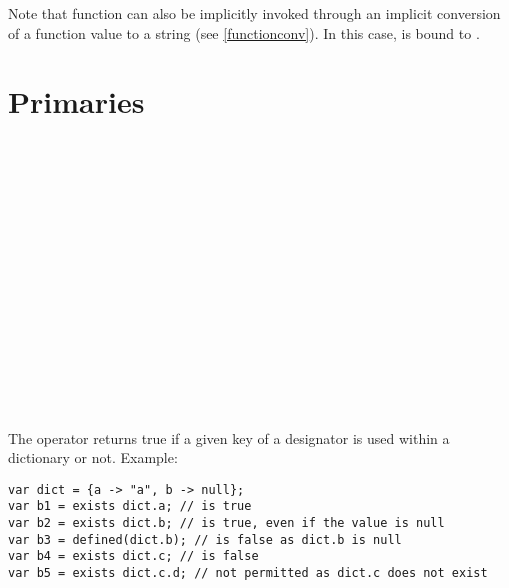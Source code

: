 Note that function can also be implicitly invoked through an implicit
conversion of a function value to a string (see \ref{functionconv}).
In this case,  is bound to .

\section{Primaries}

\begin{grammar}
      \produces {} \\
      \produces {}  \\
      \produces {}
         \lextoken{(}  \lextoken{)} \\
      \produces {} \\
      \produces {} \\
      \produces {} \\
      \produces {} \\
      \produces \lextoken{(}  \lextoken{)} \\
      \produces {} \\
      \produces {} \\
      \produces {} \\
      \produces {} \\
      \produces {} \\
      \produces {} \\
      \produces {}
\end{grammar}

\noindent
The  operator returns true if a given key of a designator
is used within a dictionary or not. Example:

\begin{lstlisting}
var dict = {a -> "a", b -> null};
var b1 = exists dict.a; // is true
var b2 = exists dict.b; // is true, even if the value is null
var b3 = defined(dict.b); // is false as dict.b is null
var b4 = exists dict.c; // is false
var b5 = exists dict.c.d; // not permitted as dict.c does not exist
\end{lstlisting}

